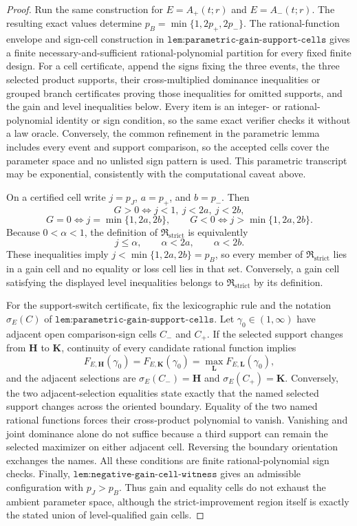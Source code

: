 \documentclass{article}
\begin{document}
\begin{proof}
Run the same construction for \(E=A_+(t;r)\) and \(E=A_-(t;r)\). The resulting exact values determine \(p_B=\min\{1,2p_+,2p_-\}\). The rational-function envelope and sign-cell construction in \(\texttt{lem:parametric-gain-support-cells}\) gives a finite necessary-and-sufficient rational-polynomial partition for every fixed finite design. For a cell certificate, append the signs fixing the three events, the three selected product supports, their cross-multiplied dominance inequalities or grouped branch certificates proving those inequalities for omitted supports, and the gain and level inequalities below. Every item is an integer- or rational-polynomial identity or sign condition, so the same exact verifier checks it without a law oracle. Conversely, the common refinement in the parametric lemma includes every event and support comparison, so the accepted cells cover the parameter space and no unlisted sign pattern is used. This parametric transcript may be exponential, consistently with the computational caveat above.

On a certified cell write \(j=p_J\), \(a=p_+\), and \(b=p_-\). Then
\[G>0\iff j<1,\ j<2a,\ j<2b,\]
\[G=0\iff j=\min\{1,2a,2b\},\qquad G<0\iff j>\min\{1,2a,2b\}.\]
Because \(0<\alpha<1\), the definition of \(\mathfrak R_{\mathrm{strict}}\) is equivalently
\[j\le\alpha,\qquad \alpha<2a,\qquad \alpha<2b.\]
These inequalities imply \(j<\min\{1,2a,2b\}=p_B\), so every member of \(\mathfrak R_{\mathrm{strict}}\) lies in a gain cell and no equality or loss cell lies in that set. Conversely, a gain cell satisfying the displayed level inequalities belongs to \(\mathfrak R_{\mathrm{strict}}\) by its definition.

For the support-switch certificate, fix the lexicographic rule and the notation \(\sigma_E(C)\) of \(\texttt{lem:parametric-gain-support-cells}\). Let \(\gamma_0\in(1,\infty)\) have adjacent open comparison-sign cells \(C_-\) and \(C_+\). If the selected support changes from \(\mathbf H\) to \(\mathbf K\), continuity of every candidate rational function implies
\[F_{E,\mathbf H}(\gamma_0)=F_{E,\mathbf K}(\gamma_0)=\max_{\mathbf L}F_{E,\mathbf L}(\gamma_0),\]
and the adjacent selections are \(\sigma_E(C_-)=\mathbf H\) and \(\sigma_E(C_+)=\mathbf K\). Conversely, the two adjacent-selection equalities state exactly that the named selected support changes across the oriented boundary. Equality of the two named rational functions forces their cross-product polynomial to vanish. Vanishing and joint dominance alone do not suffice because a third support can remain the selected maximizer on either adjacent cell. Reversing the boundary orientation exchanges the names. All these conditions are finite rational-polynomial sign checks. Finally, \(\texttt{lem:negative-gain-cell-witness}\) gives an admissible configuration with \(p_J>p_B\). Thus gain and equality cells do not exhaust the ambient parameter space, although the strict-improvement region itself is exactly the stated union of level-qualified gain cells.
\end{proof}
\end{document}
